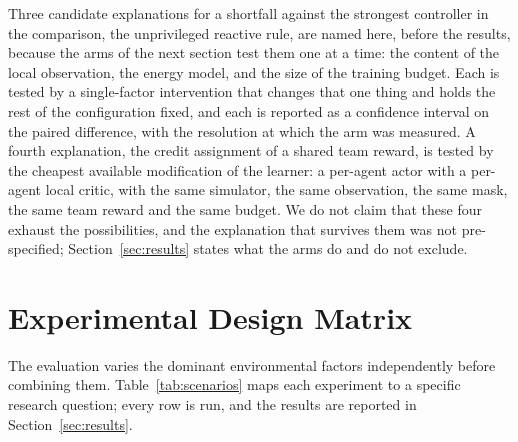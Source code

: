 \documentclass[conference]{IEEEtran}
\begin{document}
Three candidate explanations for a shortfall against the strongest controller in the comparison, the unprivileged reactive rule, are named here, before the results, because the arms of the next section test them one at a time: the content of the local observation, the energy model, and the size of the training budget. Each is tested by a single-factor intervention that changes that one thing and holds the rest of the configuration fixed, and each is reported as a confidence interval on the paired difference, with the resolution at which the arm was measured. A fourth explanation, the credit assignment of a shared team reward, is tested by the cheapest available modification of the learner: a per-agent actor with a per-agent local critic, with the same simulator, the same observation, the same mask, the same team reward and the same budget. We do not claim that these four exhaust the possibilities, and the explanation that survives them was not pre-specified; Section~\ref{sec:results} states what the arms do and do not exclude.


\section{Experimental Design Matrix}
\label{sec:experimentaldesign}
The evaluation varies the dominant environmental factors independently before combining them. Table~\ref{tab:scenarios} maps each experiment to a specific research question; every row is run, and the results are reported in Section~\ref{sec:results}.
\end{document}
